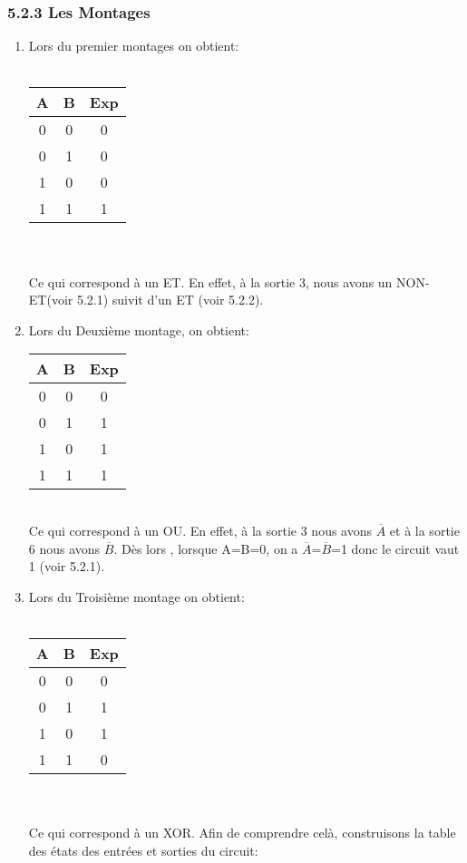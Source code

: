 \documentclass{report}
\begin{document}
\subsubsection*{5.2.3 Les Montages}
\begin{enumerate}
\item Lors du premier montages on obtient:\\
\\
\begin{tabular}{|c|c|c|}
\hline
A & B & Exp \\
\hline
0&0&0\\
0&1&0\\
1&0&0\\
1&1&1\\
\hline
\end{tabular}\\
\\
Ce qui correspond \`a un ET. En effet, à la sortie 3, nous avons un NON-ET(voir 5.2.1) suivit d'un ET (voir 5.2.2).\\
\newpage
\item Lors du Deuxi\`eme montage, on obtient:\\
\begin{tabular}{|c|c|c|}
\hline
A & B & Exp \\
\hline
0&0&0\\
0&1&1\\
1&0&1\\
1&1&1\\
\hline
\end{tabular}\\
Ce qui correspond \`a un OU. En effet, \`a la sortie 3 nous avons $\overline{A}$ et \`a la sortie 6 nous avons $\overline{B}$. D\`es lors , lorsque A=B=0, on a $\overline{A}$=$\overline{B}$=1 donc le circuit vaut 1 (voir 5.2.1).\\
\item Lors du Troisi\`eme montage on obtient:\\
\\
\begin{tabular}{|c|c|c|}
\hline
A & B & Exp \\
\hline
0&0&0\\
0&1&1\\
1&0&1\\
1&1&0\\
\hline
\end{tabular}\\
\\
Ce qui correspond \`a un XOR. Afin de comprendre cel\`a, construisons la table des \'etats des entr\'ees et sorties du circuit:\\

\end{enumerate}
\end{document}

